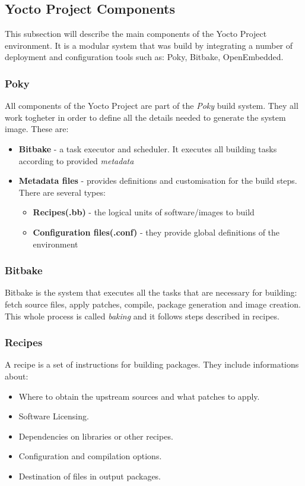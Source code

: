 \subsection{Yocto Project Components}

This subsection will describe the main components of the Yocto Project environment. It is a modular system that was build by integrating a number of deployment and configuration tools such as: Poky, Bitbake, OpenEmbedded.

\subsubsection{Poky}

All components of the Yocto Project are part of the \textit{Poky} build system. They all work togheter in order to define all the details needed to generate the system image. These are:
\begin{itemize}
  \item \textbf{Bitbake} - a task executor and scheduler. It executes all building tasks according to provided \textit{metadata}
  \item \textbf{Metadata files} - provides definitions and customisation for the build steps. There are several types:
  \begin{itemize}
    \item \textbf{Recipes(.bb)} - the logical units of software/images to build
    \item \textbf{Configuration files(.conf)} - they provide global definitions of the environment
  \end{itemize}
\end{itemize}

\subsubsection{Bitbake}

Bitbake is the system that executes all the tasks that are necessary for building: fetch source files, apply patches, compile, package generation and image creation. This whole process is called \textit{baking} and it follows steps described in recipes.

\subsubsection{Recipes}

A recipe is a set of instructions for building packages. They include informations about:
\begin{itemize}
  \item Where to obtain the upstream sources and what patches to apply.
  \item Software Licensing.
  \item Dependencies on libraries or other recipes.
  \item Configuration and compilation options.
  \item Destination of files in output packages.
\end{itemize}

